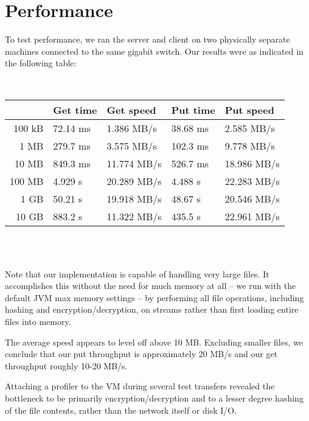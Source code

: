 \documentclass[10pt]{article}
\begin{document}
\section{Performance}

To test performance, we ran the server and client on two physically separate machines connected to the same gigabit switch.
Our results were as indicated in the following table:

~\\
\begin{centering}
\begin{tabular}{r|ll|ll}
        & Get time & Get speed & Put time & Put speed \\ \hline
 100 kB & 72.14 ms & 1.386 MB/s  & 38.68 ms &  2.585 MB/s \\
   1 MB & 279.7 ms & 3.575 MB/s  & 102.3 ms &  9.778 MB/s \\
  10 MB & 849.3 ms & 11.774 MB/s & 526.7 ms & 18.986 MB/s \\
 100 MB & 4.929 s  & 20.289 MB/s & 4.488 s  & 22.283 MB/s \\
   1 GB & 50.21 s  & 19.918 MB/s & 48.67 s  & 20.546 MB/s \\
  10 GB & 883.2 s  & 11.322 MB/s & 435.5 s  & 22.961 MB/s
\end{tabular}
\\[5pt]
\end{centering}

~\\

Note that our implementation is capable of handling very large files.
It accomplishes this without the need for much memory at all --
we run with the default JVM max memory settings --
by performing all file operations, including hashing and encryption/decryption,
on streams rather than first loading entire files into memory.

The average speed appears to level off above 10 MB.
Excluding smaller files, we conclude that our put throughput is
approximately 20 MB/s and our get throughput roughly 10-20 MB/s.

Attaching a profiler to the VM during several test transfers revealed the bottleneck
to be primarily encryption/decryption and to a lesser degree hashing of the file contents,
rather than the network itself or disk I/O.
\end{document}
